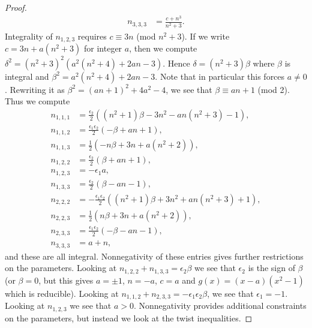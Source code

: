 \documentclass[12pt,psamsfonts]{amsart}
\newcommand{\e}{{\epsilon}}
\numberwithin{equation}{section}
\theoremstyle{definition}
\begin{document}
\begin{proof}
\begin{equation*}
\begin{split}
n_{3,3,3} & = \frac{c+n^3}{n^2+3}.
\end{split}\end{equation*}
Integrality of $n_{1,2,3}$ requires $c\equiv 3n$ (mod $n^2+3$). If
we write $c=3n+a(n^2+3)$ for integer $a$, then we compute
$\delta^2=(n^2+3)^2(a^2(n^2+4)+2an-3)$. Hence
$\delta=(n^2+3)\beta$ where $\beta$ is integral and
$\beta^2=a^2(n^2+4)+2an-3$. Note that in particular this forces
$a\ne 0$. Rewriting it as $\beta^2=(an+1)^2+4a^2-4$, we see that
$\beta\equiv an+1$ (mod 2). Thus we compute
\begin{equation*}\begin{split}
n_{1,1,1} & = \frac{\e_2}{2}((n^2+1)\beta-3n^2-an(n^2+3)-1),\\
n_{1,1,2} & = \frac{\e_1\e_2}{2}(-\beta+an+1),\\
n_{1,1,3} & = \frac{1}{2}(-n\beta+3n+a(n^2+2)),\\
n_{1,2,2} & = \frac{\e_2}{2}(\beta+an+1),\\
n_{1,2,3} & = - \e_1 a,\\
n_{1,3,3} & = \frac{\e_2}{2}(\beta-an-1),\\
n_{2,2,2} & = -\frac{\e_1\e_2}{2}((n^2+1)\beta+3n^2+an(n^2+3)+1),\\
n_{2,2,3} & = \frac{1}{2}(n\beta+3n+a(n^2+2)),\\
n_{2,3,3} & = \frac{\e_1\e_2}{2}(-\beta-an-1),\\
n_{3,3,3} & = a+n,
\end{split}\end{equation*}
and these are all integral. Nonnegativity of these entries gives
further restrictions on the parameters. Looking at
$n_{1,2,2}+n_{1,3,3}=\e_2\beta$ we see that $\e_2$ is the sign of
$\beta$ (or $\beta=0$, but this gives $a=\pm 1$, $n=-a$, $c=a$ and
$g(x)=(x-a)(x^2-1)$ which is reducible). Looking at
$n_{1,1,2}+n_{2,3,3}=-\e_1\e_2\beta$, we see that $\e_1=-1$.
Looking at $n_{1,2,3}$ we see that $a>0$.
Nonnegativity provides additional constraints on the parameters,
but instead we look at the twist inequalities.


\end{proof}
\end{document}
